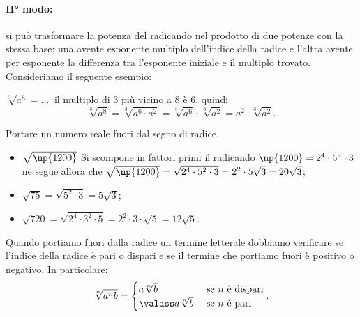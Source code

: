 \paragraph{II° modo:} si può trasformare la potenza del radicando nel prodotto di due potenze con la stessa base; una avente esponente multiplo dell'indice della radice e l'altra avente per esponente la differenza tra l'esponente iniziale e il multiplo trovato. Consideriamo il seguente esempio:

 $\sqrt[3]{a^8}=\ldots\:$ il multiplo di $3$ più vicino a $8$ è $6$, quindi 
\[\sqrt[3]{a^8}=\sqrt[3]{a^6\cdot a^2}=\sqrt[3]{a^6}\cdot \sqrt[3]{a^2}=a^2\cdot \sqrt[3]{a^2}.\]

\begin{exrig}
 \begin{esempio}
 Portare un numero reale fuori dal segno di radice.
\begin{itemize}
 \item $\sqrt{\np{1200}}$ Si scompone in fattori primi il radicando $\np{1200}=2^4\cdot 5^2\cdot 3$ ne segue allora che $\sqrt{\np{1200}}=\sqrt{2^4\cdot 5^2\cdot 3}=2^2\cdot 5\sqrt 3=20\sqrt 3$;
 \item $\sqrt{75}=\sqrt{5^2\cdot 3}=5\sqrt 3$;
 \item $\sqrt{720}=\sqrt{2^4\cdot 3^2\cdot 5}=2^2\cdot 3\cdot \sqrt 5=12\sqrt 5$.
\end{itemize}
 \end{esempio}
\end{exrig}

Quando portiamo fuori dalla radice un termine letterale dobbiamo verificare se l'indice della radice è pari o dispari e se il termine che portiamo fuori è positivo o negativo. In particolare:
\[
\sqrt[n]{a^nb}=
\begin{cases}
a\sqrt[n]b & \text{ se }n\text{ è dispari}\\
\valass a\sqrt[n]b & \text{ se }n\text{ è pari}
\end{cases}.
\]

